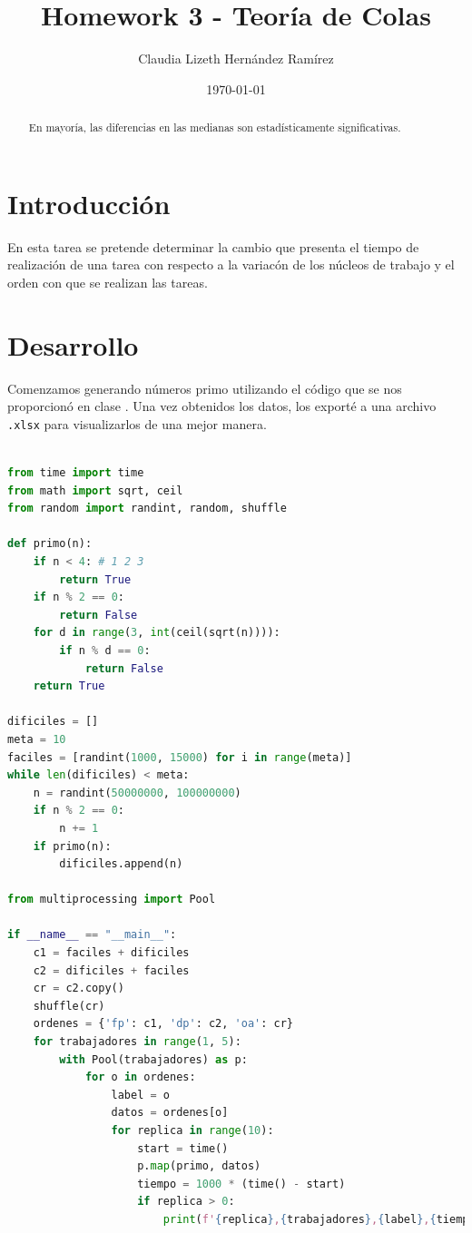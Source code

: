 \documentclass{article}
\author{Claudia Lizeth Hern\'andez Ram\'irez} %
\title{Homework 3 - Teoría de Colas} %
\date{\today}
\begin{document}

\maketitle %

\begin{abstract} %
  \centering
En mayor\'ia, las diferencias en las medianas son estad\'isticamente significativas.
  
\end{abstract}


\section{Introducci\'{o}n}\label{intro} %
En esta tarea se pretende determinar la cambio que presenta el tiempo de realizaci\'on de una tarea con respecto a la variac\'on de los n\'ucleos de trabajo y el orden con que se realizan las tareas.



\section{Desarrollo}\label{desarrollo} %
Comenzamos generando n\'umeros primo utilizando el código que se nos proporcion\'o en clase \cite{RepoDraElisa}.\; Una vez obtenidos los datos, los export\'e a una archivo \texttt{.xlsx} para visualizarlos de una mejor manera.


\begin{lstlisting}[language=Python, caption= C\'odigo para generar n\'umeros primo.]

from time import time
from math import sqrt, ceil
from random import randint, random, shuffle

def primo(n):
    if n < 4: # 1 2 3
        return True
    if n % 2 == 0:
        return False
    for d in range(3, int(ceil(sqrt(n)))):
        if n % d == 0:
            return False
    return True

dificiles = []
meta = 10
faciles = [randint(1000, 15000) for i in range(meta)]
while len(dificiles) < meta:
    n = randint(50000000, 100000000) 
    if n % 2 == 0:
        n += 1
    if primo(n):
        dificiles.append(n)

from multiprocessing import Pool

if __name__ == "__main__":
    c1 = faciles + dificiles
    c2 = dificiles + faciles
    cr = c2.copy()
    shuffle(cr)
    ordenes = {'fp': c1, 'dp': c2, 'oa': cr}
    for trabajadores in range(1, 5):
        with Pool(trabajadores) as p:
            for o in ordenes:
                label = o
                datos = ordenes[o]
                for replica in range(10):
                    start = time()
                    p.map(primo, datos)
                    tiempo = 1000 * (time() - start)
                    if replica > 0:
                        print(f'{replica},{trabajadores},{label},{tiempo}')
\end{lstlisting}
\end{document}
